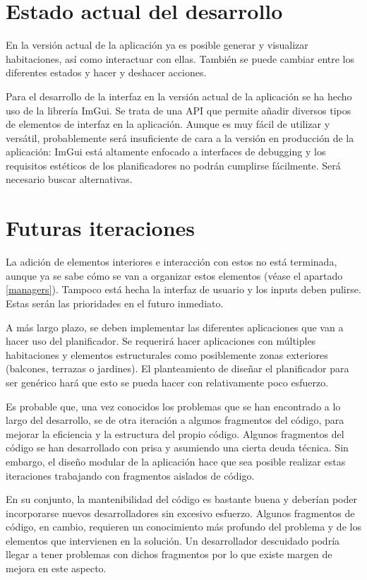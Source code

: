 \section{Estado actual del desarrollo}
En la versión actual de la aplicación ya es posible generar y visualizar habitaciones, así como interactuar con ellas. También se puede cambiar entre los diferentes estados y hacer y deshacer acciones.

Para el desarrollo de la interfaz en la versión actual de la aplicación se ha hecho uso de la librería ImGui. Se trata de una API que permite añadir diversos tipos de elementos de interfaz en la aplicación. Aunque es muy fácil de utilizar y versátil, probablemente será insuficiente de cara a la versión en producción de la aplicación: ImGui está altamente enfocado a interfaces de debugging y los requisitos estéticos de los planificadores no podrán cumplirse fácilmente. Será necesario buscar alternativas.

\section{Futuras iteraciones}
La adición de elementos interiores e interacción con estos no está terminada, aunque ya se sabe cómo se van a organizar estos elementos (véase el apartado \ref{managers}). Tampoco está hecha la interfaz de usuario y los inputs deben pulirse. Estas serán las prioridades en el futuro inmediato.

A más largo plazo, se deben implementar las diferentes aplicaciones que van a hacer uso del planificador. Se requerirá hacer aplicaciones con múltiples habitaciones y elementos estructurales como posiblemente zonas exteriores (balcones, terrazas o jardines). El planteamiento de diseñar el planificador para ser genérico hará que esto se pueda hacer con relativamente poco esfuerzo.

Es probable que, una vez conocidos los problemas que se han encontrado a lo largo del desarrollo, se de otra iteración a algunos fragmentos del código, para mejorar la eficiencia y la estructura del propio código. Algunos fragmentos del código se han desarrollado con prisa y asumiendo una cierta deuda técnica. Sin embargo, el diseño modular de la aplicación hace que sea posible realizar estas iteraciones trabajando con fragmentos aislados de código.

En su conjunto, la mantenibilidad del código es bastante buena y deberían poder incorporarse nuevos desarrolladores sin excesivo esfuerzo. Algunos fragmentos de código, en cambio, requieren un conocimiento más profundo del problema y de los elementos que intervienen en la solución. Un desarrollador descuidado podría llegar a tener problemas con dichos fragmentos por lo que existe margen de mejora en este aspecto.

